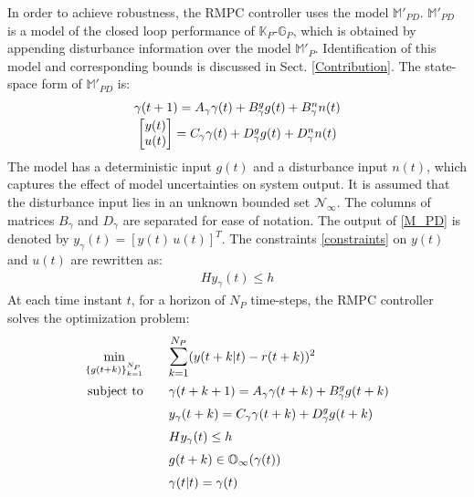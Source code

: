\documentclass[letterpaper, 10 pt, conference]{ieeeconf}  %
\begin{document}
	In order to achieve robustness, the RMPC controller uses the model $\mathbb{M}'_{PD}$. $\mathbb{M}'_{PD}$ is a model of the closed loop performance of $\mathbb{K}_P$-$\mathbb{G}_P$, which is obtained by appending disturbance information over the model $\mathbb{M}'_{P}$. Identification of this model and corresponding bounds is discussed in Sect. \ref{Contribution}. The state-space form of $\mathbb{M}'_{PD}$ is:
	\begin{equation}
	\begin{matrix}
	\gamma(t+1) = A_\gamma\gamma(t) + B^g_\gamma g(t) + B^n_\gamma n(t) \vspace{2pt}\\
	\begin{bmatrix}y(t)\\u(t)\end{bmatrix} = C_\gamma\gamma(t) + D^g_\gamma g(t) + D^n_\gamma n(t)
	\end{matrix}
	\label{M_PD}
	\end{equation}
	The model has a deterministic input $g(t)$ and a disturbance input $n(t)$, which captures the effect of model uncertainties on system output. It is assumed that the disturbance input lies in an unknown bounded set $\mathcal{N}_{\infty}$.
	The columns of matrices $B_\gamma$ and $D_\gamma$ are separated for ease of notation. The output of \eqref{M_PD} is denoted by $y_{\gamma}(t)=[y(t) \hspace{2pt} u(t)]^T$. The constraints \eqref{constraints} on $y(t)$ and $u(t)$  are rewritten as: 
	\begin{equation*}
	\begin{matrix}
	Hy_{\gamma}(t) \leq h
	\end{matrix}
	\end{equation*}
	At each time instant $t$, for a horizon of $N_P$ time-steps, the RMPC controller solves the optimization problem:
	\begin{equation}
	\small
	\begin{aligned}
	 \underset{\{g(t+k)\}_{k=1}^{N_P}}{\text{min}}
	&  \hspace{20pt} \mathlarger{\sum\limits_{k=1}^{N_P}}(y(t+k|t)-r(t+k))^2 \\
	\text{subject to}
	& \hspace{20pt} \gamma(t+k+1) = A_\gamma\gamma(t+k) + B_\gamma^g g(t+k)\\
	& \hspace{20pt} y_{\gamma}(t+k) = C_\gamma\gamma(t+k) + D_\gamma^g g(t+k)\\
	& \hspace{20pt} Hy_{\gamma}(t) \leq h \\
	& \hspace{20pt}  g(t+k) \in \mathbb{O}_{\infty}(\gamma(t)) \\
	& \hspace{20pt} \gamma(t|t) = \gamma(t)
	\end{aligned}
	\label{RMPC}
	\end{equation}
\end{document}
